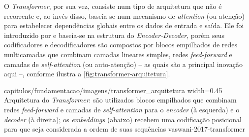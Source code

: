 O \textit{Transformer}, por sua vez, consiste num tipo de arquitetura que não é recorrente e, ao invés disso, baseia-se num mecanismo de \textit{attention} (ou atenção) para estabelecer dependências globais entre os dados de entrada e saída.
Ele foi introduzido por  e baseia-se na estrutura do \textit{Encoder-Decoder}, porém seus codificadores e decodificadores são compostos por blocos empilhados de redes multicamadas que combinam camadas lineares simples, redes \textit{feed-forward} e camadas de \textit{self-attention} (ou auto-atenção) -- as quais são a principal inovação aqui --, conforme ilustra a \autoref{fig:transformer-arquitetura}.

{capitulos/fundamentacao/imagens/transformer_arquitetura}
{width=0.45\textwidth}
{Arquitetura do \textit{Transformer}: são utilizados blocos empilhados que combinam redes \textit{feed-forward} e camadas de \textit{self-attention} para o \textit{encoder} (à esquerda) e o \textit{decoder} (à direita); os \textit{embeddings} (abaixo) recebem uma codificação posicional para que seja considerada a ordem de suas sequências}
{vaswani-2017-transformer}




